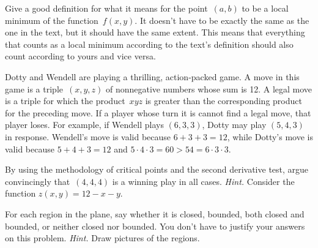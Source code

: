 \documentclass[11pt]{exam}
\newcommand{\R}{\mathbb{R}}
\begin{document}
\begin{questions}


\question[18] Give a good definition for what it means for the point~$(a,b)$ to be a local minimum of the function~$f(x,y)$. It doesn't have to be exactly the same as the one in the text, but it should have the same extent. This means that everything that counts as a local minimum according to the text's definition should also count according to yours and vice versa.

\question[16] Dotty and Wendell are playing a thrilling, action-packed game. A move in this game is a triple~$(x,y,z)$ of nonnegative numbers whose sum is 12. A legal move is a triple for which the product~$xyz$ is greater than the corresponding product for the preceding move. If a player whose turn it is cannot find a legal move, that player loses. For example, if Wendell plays $(6,3,3)$, Dotty may play $(5,4,3)$ in response. Wendell's move is valid because $6 + 3 + 3 = 12$, while Dotty's move is valid because $5 + 4 + 3 = 12$ and $5\cdot 4\cdot 3 = 60 > 54 = 6 \cdot 3 \cdot 3$.

By using the methodology of critical points and the second derivative test, argue convincingly that~$(4,4,4)$ is a winning play in all cases. \emph{Hint.} Consider the function $z(x,y) = 12 - x - y$. 

\question[16] For each region in the plane, say whether it is closed, bounded, both closed and bounded, or neither closed nor bounded. You don't have to justify your answers on this problem. \emph{Hint.} Draw pictures of the regions.

\end{questions}
\end{document}
